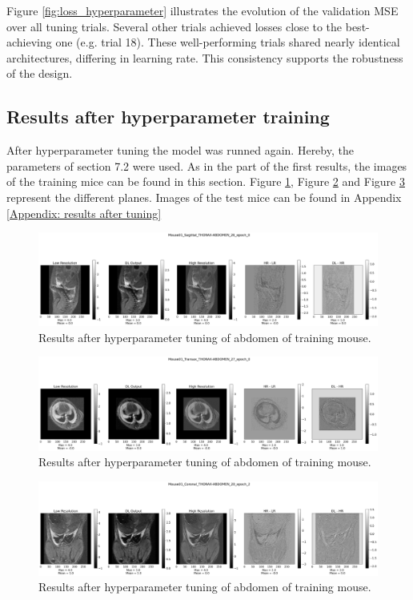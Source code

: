\documentclass[twocolumn]{article}
\begin{document}
Figure \ref{fig:loss_hyperparameter} illustrates the evolution of the validation MSE over all tuning trials.
Several other trials achieved losses close to the best-achieving one (e.g. trial 18).
These well-performing trials shared nearly identical architectures, differing in learning rate. 
This consistency supports the robustness of the design. 



\subsection{Results after hyperparameter training}
After hyperparameter tuning the model was runned again. Hereby, the parameters of section 7.2 were used.
As in the part of the first results, the images of the training mice can be found in this section.
Figure \ref{fig:second_sagittal}, Figure \ref{fig:second_transax} and Figure \ref{fig:second_coronal} represent the different planes.
Images of the test mice can be found in Appendix \ref{Appendix: results after tuning}
\begin{figure}
    \centering
    \includegraphics[width=1\linewidth]{Mouse01_Sagittal_THORAX-ABDOMEN_26_epoch_0.png}
    \caption{Results after hyperparameter tuning of abdomen of training mouse.}
    \label{fig:second_sagittal}
\end{figure}

\begin{figure}
    \centering
    \includegraphics[width=1\linewidth]{Mouse01_Transax_THORAX-ABDOMEN_27_epoch_0.png}
    \caption{Results after hyperparameter tuning of abdomen of training mouse.}
    \label{fig:second_transax}
\end{figure}

\begin{figure}
    \centering
    \includegraphics[width=1\linewidth]{Mouse01_Coronal_THORAX-ABDOMEN_20_epoch_2.png}
    \caption{Results after hyperparameter tuning of abdomen of training mouse.}
    \label{fig:second_coronal}
\end{figure}
\end{document}
